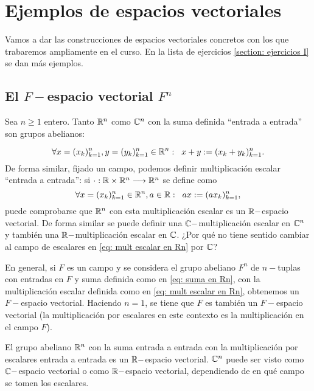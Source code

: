 \section{Ejemplos de espacios vectoriales}
Vamos a dar las construcciones de espacios vectoriales concretos con los 
que trabaremos ampliamente en el curso.
En la lista de ejercicios \ref{section: ejercicios I}
se dan más ejemplos.

\subsection{El $F-$espacio vectorial $F^{n}$}
Sea $n \geq 1$ entero.
Tanto $\mathbb{R}^{n}$ como $\mathbb{C}^{n}$ con la suma definida ``entrada a entrada''
son grupos abelianos:

\begin{equation}
	\label{eq: suma en Rn}
	\forall x = (x_{k})_{k=1}^{n}, y = (y_{k})_{k=1}^{n} \in \mathbb{R}^{n}:
	\hspace{0.2cm} x + y := (x_{k} + y_{k})_{k=1}^{n}.
\end{equation}
De forma similar, fijado un campo, podemos definir multiplicación 
escalar ``entrada a entrada'': si 
$\cdot : \mathbb{R} \times \mathbb{R}^{n} \longrightarrow \mathbb{R}^{n}$ se define como 
\begin{equation}
	\label{eq: mult escalar en Rn}
	\forall x = (x_{k})_{k=1}^{n} \in \mathbb{R}^{n}, a \in \mathbb{R}:
	\hspace{0.2cm} ax := (ax_{k})_{k=1}^{n},
\end{equation}
puede comprobarse que $\mathbb{R}^{n}$ con esta multiplicación escalar es un
$\mathbb{R}-$espacio vectorial.
De forma similar se puede definir una $\mathbb{C}-$multiplicación escalar en 
$\mathbb{C}^{n}$ y también una $\mathbb{R}-$multiplicación escalar en $\mathbb{C}$.
¿Por qué no tiene sentido cambiar al campo de escalares en \eqref{eq: mult escalar en Rn}
por $\mathbb{C}$?


En general, si $F$ es un campo y se considera el grupo abeliano
$F^{n}$ de $n-$tuplas con entradas en $F$ y suma definida como en 
\eqref{eq: suma en Rn}, con la multiplicación 
escalar definida como en \eqref{eq: mult escalar en Rn}, obtenemos un 
$F-$espacio vectorial. Haciendo $n = 1$, se tiene que $F$ es también un 
$F-$espacio vectorial (la multiplicación por escalares en este contexto es
la multiplicación en el campo $F$).

\begin{ejem}
	El grupo abeliano $\mathbb{R}^{n}$ con la suma entrada a entrada con la multiplicación
	por escalares entrada a entrada es un $\mathbb{R}-$espacio vectorial.
	$\mathbb{C}^{n}$ puede ser visto como $\mathbb{C}-$espacio vectorial o como $\mathbb{R}-$espacio vectorial,
	dependiendo de en qué campo se tomen los escalares.
\end{ejem}

